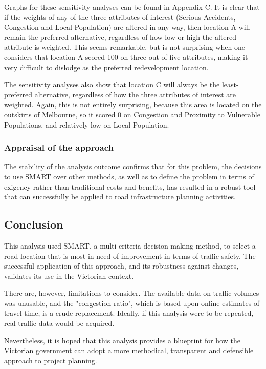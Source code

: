 \documentclass[11pt, a4paper]{article}
\begin{document}
    Graphs for these sensitivity analyses can be found in Appendix C. It is clear that if the weights of any of the three attributes of interest (Serious Accidents, Congestion and Local Population) are altered in any way, then location A will remain the preferred alternative, regardless of how low or high the altered attribute is weighted. This seems remarkable, but is not surprising when one considers that location A scored 100 on three out of five attributes, making it very difficult to dislodge as the preferred redevelopment location. 

    The sensitivity analyses also show that location C will always be the least-preferred alternative, regardless of how the three attributes of interest are weighted. Again, this is not entirely surprising, because this area is located on the outskirts of Melbourne, so it scored 0 on Congestion and Proximity to Vulnerable Populations, and relatively low on Local Population.

    \subsubsection{Appraisal of the approach}

    The stability of the analysis outcome confirms that for this problem, the decisions to use SMART over other methods, as well as to define the problem in terms of exigency rather than traditional costs and benefits, has resulted in a robust tool that can successfully be applied to road infrastructure planning activities.

    \subsection{Conclusion}

    This analysis used SMART, a multi-criteria decision making method, to select a road location that is most in need of improvement in terms of traffic safety. The successful application of this approach, and its robustness against changes, validates its use in the Victorian context.

    There are, however, limitations to consider. The available data on traffic volumes was unusable, and the "congestion ratio", which is based upon online estimates of travel time, is a crude replacement. Ideally, if this analysis were to be repeated, real traffic data would be acquired.
    
    Nevertheless, it is hoped that this analysis provides a blueprint for how the Victorian government can adopt a more methodical, transparent and defensible approach to project planning.
\end{document}
